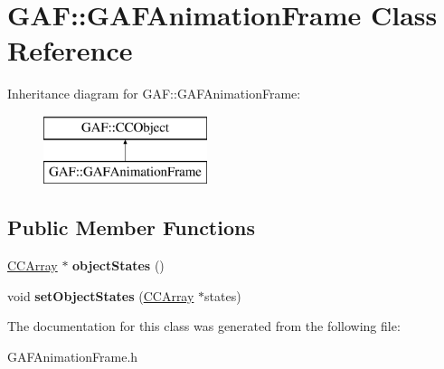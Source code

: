 \hypertarget{class_g_a_f_1_1_g_a_f_animation_frame}{\section{G\-A\-F\-:\-:G\-A\-F\-Animation\-Frame Class Reference}
\label{class_g_a_f_1_1_g_a_f_animation_frame}
}
Inheritance diagram for G\-A\-F\-:\-:G\-A\-F\-Animation\-Frame\-:\begin{figure}[H]
\begin{center}
\leavevmode
\includegraphics[height=2.000000cm]{class_g_a_f_1_1_g_a_f_animation_frame}
\end{center}
\end{figure}
\subsection*{Public Member Functions}
\begin{DoxyCompactItemize}
\item 
\hypertarget{class_g_a_f_1_1_g_a_f_animation_frame_aaab8e694d9f2c0e76490f365e2364244}{\hyperlink{class_g_a_f_1_1_c_c_array}{C\-C\-Array} $\ast$ {\bfseries object\-States} ()}\label{class_g_a_f_1_1_g_a_f_animation_frame_aaab8e694d9f2c0e76490f365e2364244}

\item 
\hypertarget{class_g_a_f_1_1_g_a_f_animation_frame_ae2124eb7022d6f60d09600cb8b7c2570}{void {\bfseries set\-Object\-States} (\hyperlink{class_g_a_f_1_1_c_c_array}{C\-C\-Array} $\ast$states)}\label{class_g_a_f_1_1_g_a_f_animation_frame_ae2124eb7022d6f60d09600cb8b7c2570}

\end{DoxyCompactItemize}


The documentation for this class was generated from the following file\-:\begin{DoxyCompactItemize}
\item 
G\-A\-F\-Animation\-Frame.\-h\end{DoxyCompactItemize}
